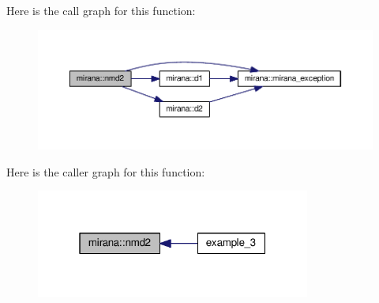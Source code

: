 Here is the call graph for this function\-:\nopagebreak
\begin{figure}[H]
\begin{center}
\leavevmode
\includegraphics[width=350pt]{classmirana_a04bd9101c8bdc2f8b69892bd773f3055_cgraph}
\end{center}
\end{figure}




Here is the caller graph for this function\-:\nopagebreak
\begin{figure}[H]
\begin{center}
\leavevmode
\includegraphics[width=256pt]{classmirana_a04bd9101c8bdc2f8b69892bd773f3055_icgraph}
\end{center}
\end{figure}



